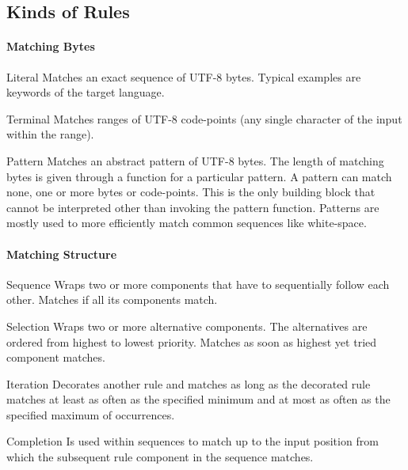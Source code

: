 \documentclass[10pt,a4paper]{article}
\begin{document}
\subsection{Kinds of Rules}
\paragraph{Matching Bytes}
\begin{rulelist}
\item[Literal] Matches an exact sequence of UTF-8 bytes. Typical examples are keywords of the target language.

\item[Terminal] Matches ranges of UTF-8 code-points (any single character of the input within the range).

\item[Pattern] Matches an abstract pattern of UTF-8 bytes. The length of matching bytes is given through a function for a particular pattern. A pattern can match none, one or more bytes or code-points. This is the only building block that cannot be interpreted other than invoking the pattern function. Patterns are mostly used to more efficiently match common sequences like white-space.
\end{rulelist}

\paragraph{Matching Structure}
\begin{rulelist}
\item[Sequence] Wraps two or more components that have to sequentially follow each other. Matches if all its components match.

\item[Selection] Wraps two or more alternative components. The alternatives are ordered from highest to lowest priority. Matches as soon as highest yet tried component matches.

\item[Iteration] Decorates another rule and matches as long as the decorated rule matches at least as often as the specified minimum and at most as often as the specified maximum of occurrences.

\item[Completion] Is used within sequences to match up to the input position from which the subsequent rule component in the sequence matches.
\end{rulelist}
\end{document}
